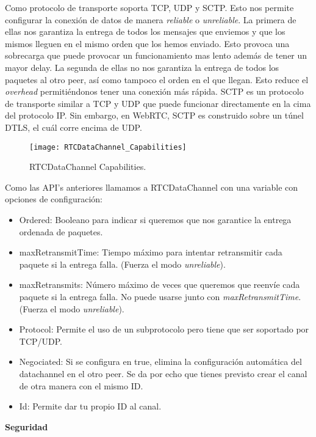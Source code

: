Como protocolo de transporte soporta TCP, UDP y SCTP. Esto nos permite configurar la conexión de datos de manera \textit{reliable} o \textit{unreliable}. La primera de ellas nos garantiza la entrega de todos los mensajes que enviemos y que los mismos lleguen en el mismo orden que los hemos enviado. Esto provoca una sobrecarga que puede provocar un funcionamiento mas lento además de tener un mayor delay. La segunda de ellas no nos garantiza la entrega de todos los paquetes al otro peer, así como tampoco el orden en el que llegan. Esto reduce el \textit{overhead} permitiéndonos tener una conexión más rápida. SCTP es un protocolo de transporte similar a TCP y UDP que puede funcionar directamente en la cima del protocolo IP. Sin embargo, en WebRTC, SCTP es construido sobre un túnel DTLS, el cuál corre encima de UDP.

\begin{figure}[htb]
\centering
\texttt{[image: RTCDataChannel\_Capabilities]}
\caption{RTCDataChannel Capabilities.}
\label{fig:datachannel_capabilities}
\end{figure}

\noindent Como las API's anteriores llamamos a RTCDataChannel con una variable con opciones de configuración:

\begin{itemize}
\item Ordered: Booleano para indicar si queremos que nos garantice la entrega ordenada de paquetes.
\item maxRetransmitTime: Tiempo máximo para intentar retransmitir cada paquete si la entrega falla. (Fuerza el modo \textit{unreliable}).
\item maxRetransmits: Número máximo de veces que queremos que reenvíe cada paquete si la entrega falla. No puede usarse junto con \textit{maxRetransmitTime}. (Fuerza el modo \textit{unreliable}).
\item Protocol: Permite el uso de un subprotocolo pero tiene que ser soportado por TCP/UDP.
\item Negociated: Si se configura en true, elimina la configuración automática del datachannel en el otro peer. Se da por echo que tienes previsto crear el canal de otra manera con el mismo ID.
\item Id: Permite dar tu propio ID al canal.
\end{itemize}

\begin{normalsize}
\noindent \textbf{Seguridad}\\
\end{normalsize}

